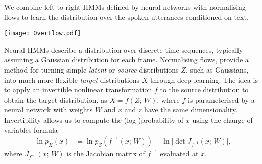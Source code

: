We combine left-to-right HMMs defined by neural networks with normalising flows to learn the distribution over the spoken utterances conditioned on text.
\vspace{0.3cm}
\begin{center}
  \vspace{-0.4cm}
  \texttt{[image: OverFlow.pdf]}  
  \vspace{-0.4cm}
\end{center}
\vspace{0.25em}

Neural HMMs describe a distribution over discrete-time sequences, typically %
assuming a Gaussian distribution for each frame.
Normalising flows,
provide a method for turning simple \emph{latent} or \emph{source} distributions $Z$, such as Gaussians, into much more flexible \emph{target} distributions $X$ through deep learning.  
The idea is to apply an invertible nonlinear transformation $f$ to the source distribution to obtain the target distribution, as $X=f(Z;\,W)$, where $f$ is parameterised by a neural network with weights $W$ and 
$x$ and $z$ have the same dimensionality.
Invertibility allows us to compute the (log-)probability of %
$x$ using the change of variables formula
\begin{align*}
\ln p_{X}(x)
& = \ln p_{Z}(f^{-1}(x;\,W))
+ \ln \vert \det J_{f^{-1}}(x;\,W) \vert
\text{,}
\end{align*}
where $J_{f^{-1}}(x;\,W)$ is the Jacobian matrix of $f^{-1}$ evaluated at $x$.
